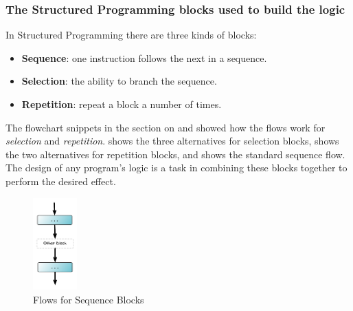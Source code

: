 
\clearpage
\subsubsection{The Structured Programming blocks used to build the logic} %
\label{ssub:structured_programming_blocks}

In Structured Programming there are three kinds of blocks:
\begin{itemize}
  \item \textbf{Sequence}: one instruction follows the next in a sequence.
  \item \textbf{Selection}: the ability to branch the sequence.
  \item \textbf{Repetition}: repeat a block a number of times.
\end{itemize}

The flowchart snippets in the section on  and  showed how the flows work for \emph{selection} and \emph{repetition}.  shows the three alternatives for selection blocks,  shows the two alternatives for repetition blocks, and  shows the standard sequence flow. The design of any program's logic is a task in combining these blocks together to perform the desired effect. 

\begin{figure}[h]
   \centering
   \includegraphics[width=0.15\textwidth]{./topics/control-flow/diagrams/SequenceFlow} 
   \caption{Flows for Sequence Blocks}
   \label{fig:sequence-flow}
\end{figure}

